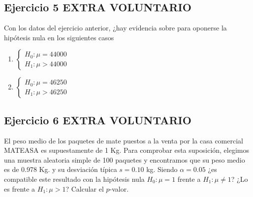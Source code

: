 \documentclass[
]{article}
\providecommand{\tightlist}{%
  \setlength{\itemsep}{0pt}\setlength{\parskip}{0pt}}
\begin{document}
\hypertarget{ejercicio-5-extra-voluntario}{%
\subsection{Ejercicio 5 EXTRA
VOLUNTARIO}\label{ejercicio-5-extra-voluntario}}

Con los datos del ejercicio anterior, ¿hay evidencia sobre para oponerse
la hipótesis nula en los siguientes casos

\begin{enumerate}
\def\labelenumi{\arabic{enumi}.}
\tightlist
\item
  \(\left\{\begin{array}{ll} H_{0}:\mu=44000\\ H_{1}:\mu>44000\end{array}\right.\)
\item
  \(\left\{\begin{array}{ll} H_{0}:\mu=46250\\ H_{1}:\mu>46250\end{array}\right.\)
\end{enumerate}

\hypertarget{ejercicio-6-extra-voluntario}{%
\subsection{Ejercicio 6 EXTRA
VOLUNTARIO}\label{ejercicio-6-extra-voluntario}}

El peso medio de los paquetes de mate puestos a la venta por la casa
comercial MATEASA es supuestamente de 1 Kg. Para comprobar esta
suposición, elegimos una muestra aleatoria simple de 100 paquetes y
encontramos que su peso medio es de 0.978 Kg. y su desviación típica
\(s=0.10\) kg. Siendo \(\alpha=0.05\) ¿es compatible este resultado con
la hipótesis nula \(H_{0}:\mu=1\) frente a \(H_{1}:\mu\not=1\)? ¿Lo es
frente a \(H_{1}:\mu>1\)? Calcular el \(p\)-valor.
\end{document}
